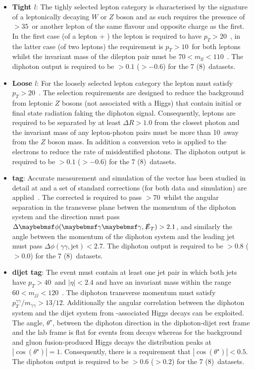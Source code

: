 \begin{itemize}
  \item \textbf{\VH Tight $l$}: The tighly selected lepton category is characterised by the signature of a leptonically decaying $W$ or $Z$ boson and as such requires the presence of \MET$>35$~\GeV or another lepton of the same flavour and opposite charge as the first. In the first case (of a lepton + \MET) the lepton is required to have $p_{T}>20$~\GeV, in the latter case (of two leptons) the requirement is $p_{T}>10$~\GeV for both leptons whilst the invariant mass of the dilepton pair must be $70 < m_{ll} < 110$~\GeV. The diphoton \BDT output is required to be $>0.1$ ($>-0.6$) for the 7 (8)~\TeV datasets.
  \item \textbf{\VH Loose $l$}: For the loosely selected lepton category the lepton \pT must satisfy $p_{T}>20$~\GeV. The selection requirements are designed to reduce the background from leptonic $Z$ bosons (not associated with a Higgs) that contain initial or final state radiation faking the diphoton signal. Consequently, leptons are required to be separated by at least $\Delta R>1.0$ from the closest photon and the invariant mass of any lepton-photon pairs must be more than 10~\GeV away from the $Z$ boson mass. In addition a conversion veto is applied to the electrons to reduce the rate of misidentified photons. The diphoton \BDT output is required to be $>0.1$ ($>-0.6$) for the 7 (8)~\TeV datasets.
  \item \textbf{\VH \MET tag}: Accurate measurement and simulation of the \MET vector has been studied in detail at \CMS and a set of standard corrections (for both data and simulation) are applied~\cite{met_corrs}. The corrected \MET is required to pass \MET$>70$~\GeV whilst the angular separation in the transverse plane betwen the momentum of the diphoton system and the \MET direction must pass $\Delta\phi(\gamma\gamma,\MET)>2.1$, and similarly the angle between the momentum of the diphoton system and the leading jet must pass $\Delta\phi(\gamma\gamma,\mbox{jet})<2.7$. The diphoton \BDT output is required to be $>0.8$ ($>0.0$) for the 7 (8)~\TeV datasets.   
  \item \textbf{\VH dijet tag}: The event must contain at least one jet pair in which both jets have $p_{T}>40$~\GeV and $|\eta|<2.4$ and have an invariant mass within the range $60<m_{jj}<120$~\GeV. The diphoton transverse momentum must satisfy $p_{T}^{\gamma\gamma}/m_{\gamma\gamma}>13/12$. Additionally the angular correlation between the diphoton system and the dijet system from \VH-associated Higgs decays can be exploited. The angle, $\theta^{\star}$, between the diphoton direction in the diphoton-dijet rest frame and the lab frame is flat for events from \VH decays whereas for the background and gluon fusion-produced Higgs decays the distribution peaks at $|\cos(\theta^{\star})|=1$. Consequently, there is a requirement that $|\cos(\theta^{\star})|<0.5$. The diphoton \BDT output is required to be $>0.6$ ($>0.2$) for the 7 (8)~\TeV datasets. 
\end{itemize}

